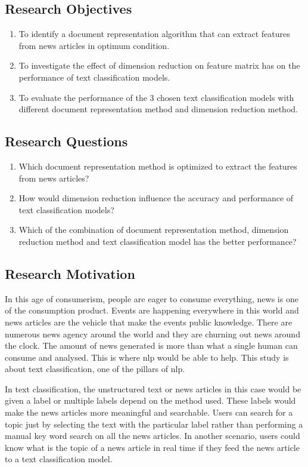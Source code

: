 \subsection{Research Objectives}
\begin{enumerate}
	\item To identify a document representation algorithm that can extract features from news articles in optimum condition.
	\item To investigate the effect of dimension reduction on feature matrix has on the performance of text classification models.
	\item To evaluate the performance of the 3 chosen text classification models with different document representation method and dimension reduction method.
\end{enumerate}


\subsection{Research Questions}
\begin{enumerate}
	\item Which document representation method is optimized to extract the features from news articles?
	\item How would dimension reduction influence the accuracy and performance of text classification models?
	\item Which of the combination of document representation method, dimension reduction method and text classification model has the better performance?
\end{enumerate}

\subsection{Research Motivation}
In this age of consumerism, people are eager to consume everything, news is one of the consumption product. Events are happening everywhere in this world and news articles are the vehicle that make the events public knowledge. There are numerous news agency around the world and they are churning out news around the clock. The amount of news generated is more than what a single human can consume and analysed. This is where \ac{nlp} would be able to help. This study is about text classification, one of the pillars of \ac{nlp}.

In text classification, the unstructured text or news articles in this case would be given a label or multiple labels depend on the method used. These labels would make the news articles more meaningful and searchable. Users can search for a topic just by selecting the text with the particular label rather than performing a manual key word search on all the news articles. In another scenario, users could know what is the topic of a news article in real time if they feed the news article to a text classification model.

